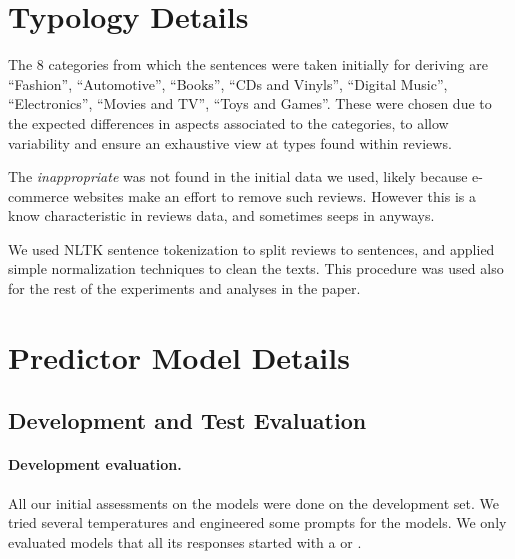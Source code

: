 \appendix

\section{Typology Details}
\label{sec_appendix_taxonomy}

The 8 categories from which the sentences were taken initially for deriving \taxtypes{} are ``Fashion'', ``Automotive'', ``Books'', ``CDs and Vinyls'', ``Digital Music'', ``Electronics'', ``Movies and TV'', ``Toys and Games''. These were chosen due to the expected differences in aspects associated to the categories, to allow variability and ensure an exhaustive view at types found within reviews.

The \textit{inappropriate} \taxtype{} was not found in the initial data we used, likely because e-commerce websites make an effort to remove such reviews. However this \taxtype{} is a know characteristic in reviews data, and sometimes seeps in anyways.

We used NLTK \citep{bird2006nltk} sentence tokenization to split reviews to sentences, and applied simple normalization techniques to clean the texts. This procedure was used also for the rest of the experiments and analyses in the paper.


\section{Predictor Model Details}
\label{sec_appendix_predictor}

\subsection{Development and Test Evaluation}
\label{sec_appendix_predictor_data_evaluation}


\paragraph{Development evaluation.}
All our initial assessments on the models were done on the development set. We tried several temperatures and engineered some prompts for the models. We only evaluated models that all its responses started with a  or . 

